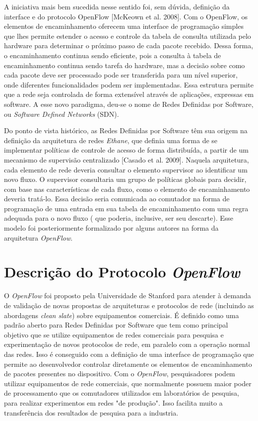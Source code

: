 A iniciativa mais bem sucedida nesse sentido foi, sem dúvida,
definição da interface e do protocolo OpenFlow [McKeown et al.
2008]. Com o OpenFlow, os elementos de encaminhamento 
oferecem uma interface de programação simples que lhes
permite estender o acesso e controle da tabela de consulta 
utilizada pelo hardware para determinar o próximo passo de 
cada pacote recebido. Dessa forma, o encaminhamento continua 
sendo eficiente, pois a consulta à tabela de encaminhamento 
continua sendo tarefa do hardware, mas a decisão sobre 
como cada pacote deve ser processado pode ser transferida
para um nível superior, onde diferentes funcionalidades 
podem ser implementadas. Essa estrutura permite que a rede
seja controlada de forma extensível através de aplicações,
expressas em software. A esse novo paradigma, deu-se o 
nome de Redes Definidas por Software, ou \textit{Software
Defined Networks} (SDN).

Do ponto de vista histórico, as Redes Definidas por 
Software têm sua origem na definição
da arquitetura de redes \textit{Ethane}, que definia uma forma
de se implementar políticas de controle de acesso de forma 
distribuída, a partir de um mecanismo de supervisão centralizado
[Casado et al. 2009]. Naquela arquitetura, cada elemento de 
rede deveria consultar o elemento supervisor ao identificar um
novo fluxo. O supervisor consultaria um grupo de políticas 
globais para decidir, com base nas características de cada
fluxo, como o elemento de encaminhamento deveria 
tratá-lo. Essa decisão seria comunicada ao comutador na 
forma de programação de uma entrada em sua tabela de
encaminhamento com uma regra adequada para o novo fluxo (
que poderia, inclusive, ser seu descarte). Esse modelo foi
posteriormente formalizado por alguns autores na forma da 
arquitetura \textit{OpenFlow}.

\section{Descrição do Protocolo \textit{OpenFlow}}

O \textit{OpenFlow} foi proposto pela Universidade de
Stanford para atender à demanda de validação de novas
propostas de arquiteturas e protocolos de rede (incluindo as
abordagens \textit{clean slate}) sobre equipamentos
comerciais. É definido como uma padrão aberto para Redes
Definidas por Software que tem como principal objetivo que 
se utilize equipamentos de redes comerciais para pesquisa e 
experimentação de novos protocolos de rede, em paralelo
com a operação normal das redes. Isso é conseguido com a 
definição de uma interface de programação que permite 
ao desenvolvedor controlar diretamente os elementos de 
encaminhamento de pacotes presentes no dispositivo. Com o 
\textit{OpenFlow}, pesquisadores podem utilizar equipamentos de 
rede comerciais, que normalmente possuem maior poder 
de processamento que os comutadores utilizados em 
laboratórios de pesquisa, para realizar experimentos em redes
"de produção". Isso facilita muito a transferência dos resultados
de pesquisa para a industria. 

